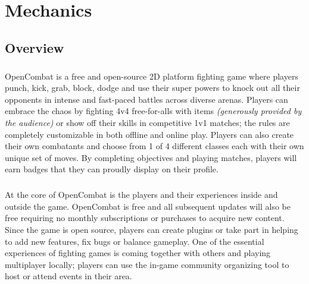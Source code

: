 \chapter{Mechanics}

\section{Overview}

\paragraph{} OpenCombat is a free and open-source 2D platform fighting game where players punch, kick, grab, block, dodge and use their super powers to knock out all their opponents in intense and fast-paced battles across diverse arenas. Players can embrace the chaos by fighting 4v4 free-for-alls with items \textit{(generously provided by the audience)} or show off their skills in competitive 1v1 matches; the rules are completely customizable in both offline and online play. Players can also create their own combatants and choose from 1 of 4 different classes each with their own unique set of moves. By completing objectives and playing matches, players will earn badges that they can proudly display on their profile.

\paragraph{} At the core of OpenCombat is the players and their experiences inside and outside the game. OpenCombat is free and all subsequent updates will also be free requiring no monthly subscriptions or purchases to acquire new content. Since the game is open source, players can create plugins or take part in helping to add new features, fix bugs or balance gameplay. One of the essential experiences of fighting games is coming together with others and playing multiplayer locally; players can use the in-game community organizing tool to host or attend events in their area.

\pagebreak

